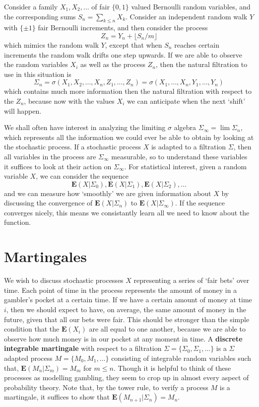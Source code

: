 \begin{example}
    Consider a family $X_1, X_2, \dots$ of fair $\{ 0,1 \}$ valued Bernoulli random variables, and the corresponding sums $S_n = \sum_{k \leq n} X_k$. Consider an independent random walk $Y$ with $\{ \pm 1 \}$ fair Bernoulli increments, and then consider the process
    \[ Z_n = Y_n + \lfloor S_n/m \rfloor \]
    which mimics the random walk $Y$, except that when $S_n$ reaches certain increments the random walk drifts one step upwards. If we are able to observe the random variables $X_i$ as well as the process $Z_n$, then the natural filtration to use in this situation is
    \[ \Sigma_n = \sigma(X_1,X_2,\dots,X_n,Z_1, \dots, Z_n) = \sigma(X_1,\dots,X_n,Y_1,\dots,Y_n) \]
    which contains much more information then the natural filtration with respect to the $Z_n$, because now with the values $X_i$ we can anticipate when the next `shift' will happen.
\end{example}

We shall often have interest in analyzing the limiting $\sigma$ algebra $\Sigma_\infty = \lim \Sigma_n$, which represents all the information we could ever be able to obtain by looking at the stochastic process. If a stochastic process $X$ is adapted to a filtration $\Sigma$, then all variables in the process are $\Sigma_\infty$ measurable, so to understand these variables it suffices to look at their action on $\Sigma_\infty$. For statistical interest, given a random variable $X$, we can consider the sequence
%
\[ \mathbf{E}(X|\Sigma_0), \mathbf{E}(X|\Sigma_1), \mathbf{E}(X|\Sigma_2), \dots \]
%
and we can measure how `smoothly' we are given information about $X$ by discussing the convergence of $\mathbf{E}(X|\Sigma_n)$ to $\mathbf{E}(X|\Sigma_\infty)$. If the sequence converges nicely, this means we consistantly learn all we need to know about the function.

\section{Martingales}

We wish to discuss stochastic processes $X$ representing a series of `fair bets' over time. Each point of time in the process represents the amount of money in a gambler's pocket at a certain time. If we have a certain amount of money at time $i$, then we should expect to have, on average, the same amount of money in the future, given that all our bets were fair. This should be stronger than the simple condition that the $\mathbf{E}(X_i)$ are all equal to one another, because we are able to observe how much money is in our pocket at any moment in time. A {\bf discrete integrable martingale} with respect to a filtration $\Sigma = \{ \Sigma_0, \Sigma_1, \dots \}$ is a $\Sigma$ adapted process $M = \{ M_0, M_1, \dots \}$ consisting of integrable random variables such that, $\mathbf{E}(M_n | \Sigma_m) = M_m$ for $m \leq n$. Though it is helpful to think of these processes as modelling gambling, they seem to crop up in almost every aspect of probability theory. Note that, by the tower rule, to verify a process $M$ is a martingale, it suffices to show that $\mathbf{E}(M_{n+1}|\Sigma_n) = M_n$.

